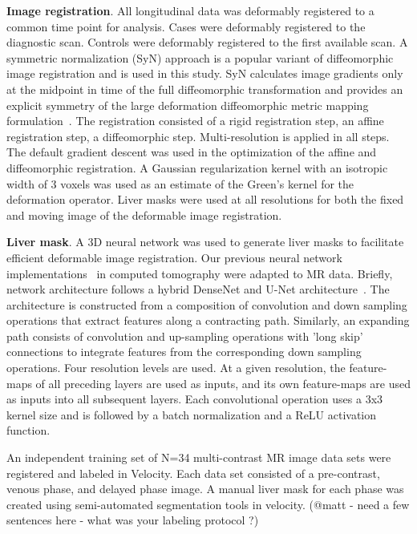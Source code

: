 \documentclass{article}         %
\theoremstyle{definition}
\theoremstyle{remark}
\begin{document}
\textbf{Image registration}.
All longitudinal data was deformably registered to a common time point for analysis.
Cases were deformably registered to the diagnostic scan.
Controls  were deformably registered to the first available scan.
A symmetric normalization (SyN) approach \cite{fuentes2015morphometry}  is a popular
variant of diffeomorphic image registration and is used in this study.
SyN calculates image gradients only at the
midpoint in time of the full diffeomorphic transformation and provides an explicit
symmetry of the large deformation diffeomorphic metric mapping formulation~\cite{beg2005computing}.
The registration consisted of a rigid registration step, an
affine registration step, a diffeomorphic step. Multi-resolution is applied in all steps.
The default gradient descent was used in
the optimization of the affine and diffeomorphic registration. A Gaussian regularization
kernel with an isotropic width of 3 voxels was used as an estimate of the Green's kernel
for the deformation operator.
Liver masks were used at all resolutions for both the fixed and moving image of the deformable image registration.


\textbf{Liver mask}.
A 3D neural network was used to generate liver masks to facilitate efficient deformable image
registration. Our previous neural network implementations~\cite{Gates2018,Morshid2019} in
computed tomography were adapted to MR data.  Briefly, network architecture follows a
hybrid DenseNet and U-Net architecture~\cite{huang2017densely,ronneberger2015u,kamnitsas2016deepmedic}.  The
architecture is constructed from a composition of convolution and down sampling operations
that extract features along a contracting path.  Similarly, an expanding path consists of
convolution and up-sampling operations with 'long skip' connections to integrate features
from the corresponding down sampling operations. Four resolution levels are used.  At a
given resolution, the feature-maps of all preceding layers are used as inputs, and its own
feature-maps are used as inputs into all subsequent layers.  Each convolutional operation
uses a 3x3 kernel size and is followed by a batch normalization and a ReLU activation function.

An independent training set of N=34 multi-contrast MR image data sets were registered and
labeled in Velocity.
Each data set consisted of a pre-contrast, venous phase, and delayed phase image. A manual
liver mask for each phase was created using semi-automated segmentation tools in velocity.
{\color{red}(@matt - need a few sentences here - what was your labeling protocol ?)}
\end{document}
